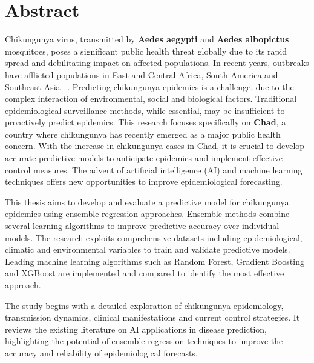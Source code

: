 \chapter*{Abstract}

\renewcommand{\abstractnamefont}{\normalfont\Large\bfseries}

\hskip7mm
%

\begin{spacing}{1.3}
Chikungunya virus, transmitted by \textbf{Aedes aegypti} and \textbf{Aedes albopictus} mosquitoes, poses a significant public health threat globally due to its rapid spread and debilitating impact on affected populations. In recent years, outbreaks have afflicted populations in East and Central Africa, South America and Southeast Asia ~\cite{intro}. Predicting chikungunya epidemics is a challenge, due to the complex interaction of environmental, social and biological factors. Traditional epidemiological surveillance methods, while essential, may be insufficient to proactively predict epidemics. This research focuses specifically on \textbf{Chad}, a country where chikungunya has recently emerged as a major public health concern. With the increase in chikungunya cases in Chad, it is crucial to develop accurate predictive models to anticipate epidemics and implement effective control measures. The advent of artificial intelligence (AI) and machine learning techniques offers new opportunities to improve epidemiological forecasting.

This thesis aims to develop and evaluate a predictive model for chikungunya epidemics using ensemble regression approaches. Ensemble methods combine several learning algorithms to improve predictive accuracy over individual models. The research exploits comprehensive datasets including epidemiological, climatic and environmental variables to train and validate predictive models. Leading machine learning algorithms such as Random Forest, Gradient Boosting and XGBoost are implemented and compared to identify the most effective approach.

The study begins with a detailed exploration of chikungunya epidemiology, transmission dynamics, clinical manifestations and current control strategies. It reviews the existing literature on AI applications in disease prediction, highlighting the potential of ensemble regression techniques to improve the accuracy and reliability of epidemiological forecasts.


\end{spacing}
